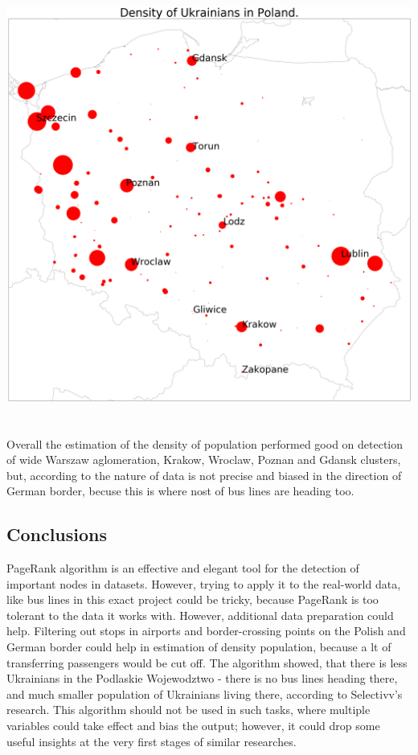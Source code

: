  \includegraphics[height=15cm]{index.png}\\[1cm]
 \newline
 \newline
 Overall the estimation of the density of population performed good on detection of wide Warszaw aglomeration, Krakow, Wroclaw, Poznan and Gdansk clusters, but, according to the nature of data is not precise and biased in the direction of German border, becuse this is where nost of bus lines are heading too.
 \subsection{Conclusions}
 PageRank algorithm is an effective and elegant tool for the detection of important nodes in datasets. However, trying to apply it to the real-world data, like bus lines in this exact project could be tricky, because PageRank is too tolerant to the data it works with.
 \newline
 However, additional data preparation could help. Filtering out stops in airports and border-crossing points on the Polish and German border could help in estimation of density population, because a lt of transferring passengers would be cut off.
 \newline
 The algorithm showed, that there is less Ukrainians in the Podlaskie Wojewodztwo - there is no bus lines heading there, and much smaller population of Ukrainians living there, according to Selectivv's research.
 \newline
 This algorithm should not be used in such tasks, where multiple variables could take effect and bias the output; however, it could drop some useful insights at the very first stages of similar researches.


